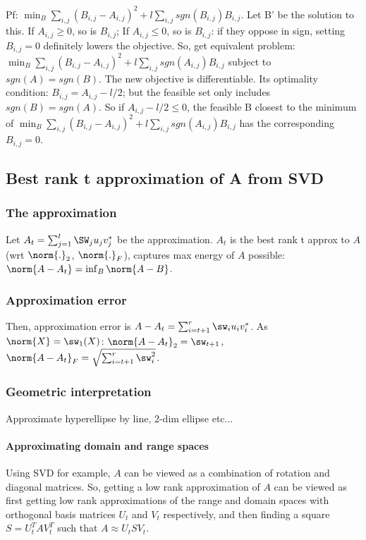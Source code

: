 \documentclass[oneside, article]{memoir}
\begin{document}
Pf: $\min_B \sum_{i, j}(B_{i,j} - A_{i, j})^{2} + l\sum_{i, j} sgn(B_{i, j})B_{i, j} $. Let B' be the solution to this. If $A_{i, j} \geq 0$, so is $B_{i, j}$; If $A_{i, j} \leq 0$, so is $B_{i, j}$: if they oppose in sign, setting $B_{i, j} = 0$ definitely lowers the objective. So, get equivalent problem: $\min_B \sum_{i, j}(B_{i,j} - A_{i, j})^{2} + l\sum_{i, j} sgn(A_{i, j})B_{i, j}$ subject to $sgn(A) = sgn(B)$. The new objective is differentiable. Its optimality condition: $B_{i, j} = A_{i, j} - l/2$; but the feasible set only includes $sgn(B) = sgn(A)$. So if $A_{i, j} - l/2 \leq 0$, the feasible B closest to the minimum of $\min_B \sum_{i, j}(B_{i,j} - A_{i, j})^{2} + l\sum_{i, j} sgn(A_{i, j})B_{i, j}$ has the corresponding $B_{i, j} = 0$.

\subsection{Best rank t approximation of A from SVD}
\subsubsection{The approximation}
Let $A_{t} = \sum_{j=1}^{t} \SW_{j}u_{j}v_{j}^{*}$ be the approximation. $A_{t}$ is the best rank t approx to $A$ (wrt $\norm{.}_{2}$, $\norm{.}_{F}$), captures max energy of $A$ possible: $\norm{A-A_{t}} = \inf_{B} \norm{A-B}$.

\subsubsection{Approximation error}
Then, approximation error is $A-A_{t} = \sum_{i=t+1}^{r}\sw_{i}u_{i}v_{i}^{*}$. As $\norm{X} = \sw_1(X)$: $\norm{A-A_{t}}_{2} = \sw_{t+1}$, $\norm{A-A_{t}}_{F} = \sqrt{\sum_{i=t+1}^{r} \sw_{i}^{2}}$.

\subsubsection{Geometric interpretation}
Approximate hyperellipse by line, 2-dim ellipse etc... 

\paragraph*{Approximating domain and range spaces}
Using SVD for example, $A$ can be viewed as a combination of rotation and diagonal matrices. So, getting a low rank approximation of $A$ can be viewed as first getting low rank approximations of the range and domain spaces with orthogonal basis matrices $U_t$ and $V_t$ respectively, and then finding a square $S = U_t^{T}AV_t^{T}$ such that $A \approx U_t S V_t$.
\end{document}
